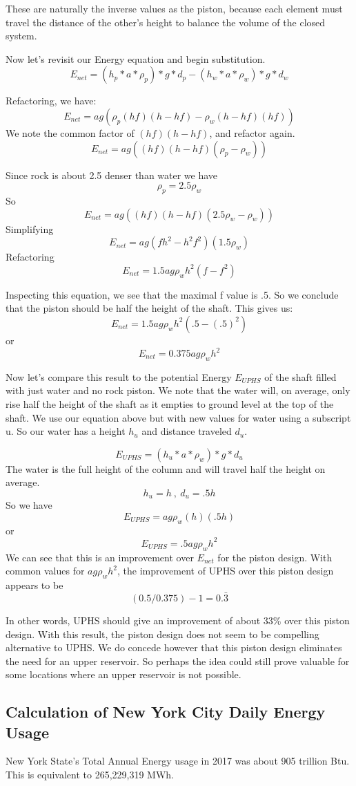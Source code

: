 These are naturally the inverse values as the piston, because each element must travel the distance of the other's height to balance the volume of the closed system.

Now let's revisit our Energy equation and begin substitution.
\[ E_{net} = (h_p*a*\rho_p)*g*d_p - (h_w*a*\rho_w)*g*d_w  \]

Refactoring, we have:
\[ E_{net} = ag(\rho_p(hf)(h-hf) - \rho_w(h-hf)(hf)) \]
We note the common factor of $(hf)(h-hf)$, and refactor again.
\[ E_{net} = ag((hf)(h-hf)(\rho_p - \rho_w)) \]

Since rock is about 2.5 denser than water we have
\[ \rho_p = 2.5\rho_w \]
So
\[ E_{net} = ag((hf)(h-hf)(2.5\rho_w - \rho_w)) \]
Simplifying
\[ E_{net} = ag(fh^2 - h^2f^2)(1.5\rho_w) \]
Refactoring
\[ E_{net} = 1.5ag\rho_wh^2(f - f^2) \]

Inspecting this equation, we see that the maximal f value is .5. So we conclude that the piston should be half the height of the shaft. This gives us:
\[ E_{net} = 1.5ag\rho_wh^2(.5 - (.5)^2) \]
or
\[ E_{net} = 0.375ag\rho_wh^2 \]

Now let's compare this result to the potential Energy $E_{UPHS}$ of the shaft filled with just water and no rock piston. We note that the water will, on average, only rise half the height of the shaft as it empties to ground level at the top of the shaft. We use our equation above but with new values for water using a subscript u. So our water has a height $h_u$ and distance traveled $d_u$.

\[ E_{UPHS} = (h_u*a*\rho_w)*g*d_u \]
The water is the full height of the column and will travel half the height on average.
\[ h_u = h \ , \ d_u = .5h \]
So we have
\[ E_{UPHS} = ag\rho_w(h)(.5h) \]
or
\[ E_{UPHS} = .5ag\rho_wh^2 \]
We can see that this is an improvement over $E_{net}$ for the piston design. With common values for $ag\rho_wh^2$, the improvement of UPHS over this piston design appears to be
\[ (0.5 / 0.375) - 1 = 0.\bar3 \]

In other words, UPHS should give an improvement of about 33\% over this piston design. With this result, the piston design does not seem to be compelling alternative to UPHS. We do concede however that this piston design eliminates the need for an upper reservoir. So perhaps the idea could still prove valuable for some locations where an upper reservoir is not possible.

\subsection{Calculation of New York City Daily Energy Usage}
New York State's Total Annual Energy usage in 2017 was about 905 trillion Btu\cite{NewYorkStateEnergyProfile}. This is equivalent to 265,229,319 MWh.

